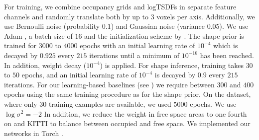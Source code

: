 For training, we combine occupancy grids and logTSDFs in separate feature channels and randomly translate both by up to $3$ voxels per axis. Additionally, we use Bernoulli noise (probability $0.1$) and Gaussian noise (variance $0.05$). We use Adam \citep{Kingma2015ICLR}, a batch size of $16$ and the initialization scheme by \cite{Glorot2010AISTATS}. The shape prior is trained for $3000$ to $4000$ epochs with an initial learning rate of $10^{-4}$ which is decayed by $0.925$ every $215$ iterations until a minimum of $10^{-16}$ has been reached. In addition, weight decay ($10^{-4}$) is applied. For shape inference, training takes $30$ to $50$ epochs, and an initial learning rate of $10^{-4}$ is decayed by $0.9$ every $215$ iterations. For our learning-based baselines (see ) we require between $300$ and $400$ epochs using the same training procedure as for the shape prior. On the \Kinect dataset, where only $30$ training examples are available, we used $5000$ epochs. We use $\log \sigma^2 = -2$   In addition, we reduce the weight in free space areas to one fourth on \noisy and KITTI to balance between occupied and free space. We implemented our networks in Torch \citep{Collobert2011NIPSWORK}.